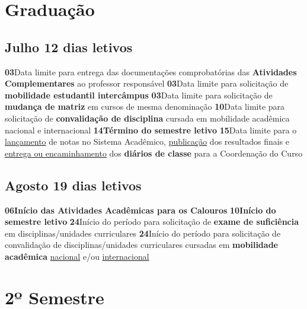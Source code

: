 \documentclass[thesis]{hmcposter}
\begin{document}
\begin{poster}
\section{\color{hmcorange}Graduação}\subsection{Julho \hfill 12 dias letivos}\textbf{03}\qquad Data limite para entrega das documentações comprobatórias das \textbf{Atividades Complementares} ao professor responsável \newline \null\textbf{03}\qquad Data limite para solicitação de \textbf{mobilidade estudantil intercâmpus} \newline \null\textbf{03}\qquad Data limite para solicitação de \textbf{mudança de matriz} em cursos de mesma denominação \newline \null\textbf{10}\qquad Data limite para solicitação de \textbf{convalidação de disciplina} cursada em mobilidade acadêmica nacional e internacional \newline \null\textbf{14}\qquad \textbf{Término do semestre letivo} \newline \null\textbf{15}\qquad Data limite para o \underline{lançamento} de notas no Sistema Acadêmico, \underline{publicação} dos resultados finais e \underline{entrega ou encaminhamento} dos \textbf{diários de classe} para a Coordenação do Curso \newline \null\subsection{Agosto \hfill 19 dias letivos}\textbf{06}\qquad \textbf{Início das Atividades Acadêmicas para os Calouros} \newline \null\textbf{10}\qquad \textbf{Início do semestre letivo} \newline \null\textbf{24}\qquad Início do período para solicitação de \textbf{exame de suficiência} em disciplinas/unidades curriculares \newline \null\textbf{24}\qquad Início do período para solicitação de convalidação de disciplinas/unidades curriculares cursadas em \textbf{mobilidade acadêmica} \underline{nacional} e/ou \underline{internacional} \newline \null\vfill\null
\columnbreak
\section{\hfill \color{hmcorange}2º Semestre}

\end{poster}
\end{document}
